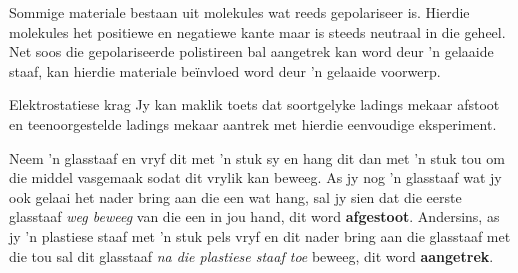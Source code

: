 Sommige materiale bestaan uit molekules wat reeds gepolariseer is. Hierdie molekules het positiewe en negatiewe kante maar is steeds neutraal in die geheel. Net soos die gepolariseerde polistireen bal aangetrek kan word deur 'n gelaaide staaf, kan hierdie materiale be\"invloed word deur 'n gelaaide voorwerp. \par



\begin{Investigation}{Elektrostatiese krag}
            \nopagebreak
Jy kan maklik toets dat soortgelyke ladings mekaar afstoot en teenoorgestelde ladings mekaar aantrek met hierdie eenvoudige eksperiment. \par      

Neem 'n glasstaaf en vryf dit met 'n stuk sy en hang dit dan met 'n stuk tou om die middel vasgemaak sodat dit vrylik kan beweeg. As jy nog 'n glasstaaf wat jy ook gelaai het nader bring aan die een wat hang, sal jy sien dat die eerste glasstaaf \textsl{weg beweeg} van die een in jou hand, dit word \textbf{afgestoot}. Andersins, as jy 'n plastiese staaf met 'n stuk pels vryf en dit nader bring aan die glasstaaf met die tou sal dit glasstaaf \textsl{na die plastiese staaf toe} beweeg, dit word \textbf{aangetrek}.\par
      
	\begin{figure}[H] %
     \begin{center}
  \end{center}
 \end{figure}       
	\begin{figure}[H] %
     \begin{center}

\end{center}
\end{figure}
\end{Investigation}
